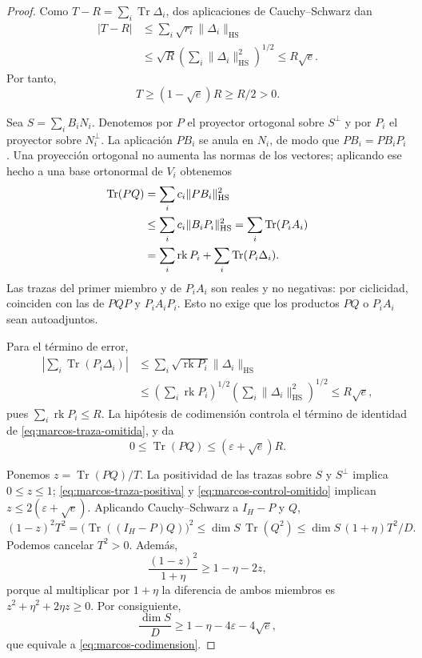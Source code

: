 \begin{proof}
Como $T-R=\sum_i\operatorname{Tr}\Delta_i$, dos aplicaciones de
Cauchy--Schwarz dan
\begin{align*}
 |T-R|&\le\sum_i\sqrt{r_i}\|\Delta_i\|_{\mathrm{HS}}\\
 &\le\sqrt R\left(\sum_i\|\Delta_i\|_{\mathrm{HS}}^2\right)^{1/2}
 \le R\sqrt e.
\end{align*}
Por tanto,
\begin{equation}
 T\ge(1-\sqrt e)R\ge R/2>0.
 \label{eq:marcos-traza-positiva}
\end{equation}

Sea $S=\sum_iB_iN_i$. Denotemos por $P$ el proyector ortogonal
sobre $S^\perp$ y por $P_i$ el proyector sobre $N_i^\perp$.
La aplicación $PB_i$ se anula en $N_i$, de modo que $PB_i=PB_iP_i$.
Una proyección ortogonal no aumenta las normas de los vectores; aplicando
ese hecho a una base ortonormal de $V_i$ obtenemos
\begin{align}
 \operatorname{Tr}(PQ)
 &=\sum_i c_i\|PB_i\|_{\mathrm{HS}}^2\notag\\
 &\le\sum_i c_i\|B_iP_i\|_{\mathrm{HS}}^2
 =\sum_i\operatorname{Tr}(P_iA_i)\notag\\
 &=\sum_i\operatorname{rk}P_i+
       \sum_i\operatorname{Tr}(P_i\Delta_i).
 \label{eq:marcos-traza-omitida}
\end{align}
Las trazas del primer miembro y de $P_iA_i$ son reales y no negativas:
por ciclicidad, coinciden con las de $PQP$ y $P_iA_iP_i$.
Esto no exige que los productos $PQ$ o $P_iA_i$ sean autoadjuntos.

Para el término de error,
\begin{align*}
 \left|\sum_i\operatorname{Tr}(P_i\Delta_i)\right|
 &\le\sum_i\sqrt{\operatorname{rk}P_i}\|\Delta_i\|_{\mathrm{HS}}\\
 &\le\left(\sum_i\operatorname{rk}P_i\right)^{1/2}
       \left(\sum_i\|\Delta_i\|_{\mathrm{HS}}^2\right)^{1/2}
 \le R\sqrt e,
\end{align*}
pues $\sum_i\operatorname{rk}P_i\le R$. La hipótesis de codimensión
controla el término de identidad de \eqref{eq:marcos-traza-omitida}, y da
\begin{equation}
 0\le\operatorname{Tr}(PQ)\le(\varepsilon+\sqrt e)R.
 \label{eq:marcos-control-omitido}
\end{equation}

Ponemos $z=\operatorname{Tr}(PQ)/T$. La positividad de las trazas
sobre $S$ y $S^\perp$ implica $0\le z\le1$;
\eqref{eq:marcos-traza-positiva} y \eqref{eq:marcos-control-omitido}
implican $z\le2(\varepsilon+\sqrt e)$. Aplicando Cauchy--Schwarz
a $I_H-P$ y $Q$,
\[
 (1-z)^2T^2
 =\bigl(\operatorname{Tr}((I_H-P)Q)\bigr)^2
 \le\dim S\,\operatorname{Tr}(Q^2)
 \le\dim S\,(1+\eta)T^2/D.
\]
Podemos cancelar $T^2>0$. Además,
\[
 \frac{(1-z)^2}{1+\eta}\ge1-\eta-2z,
\]
porque al multiplicar por $1+\eta$ la diferencia de ambos miembros
es $z^2+\eta^2+2\eta z\ge0$. Por consiguiente,
\[
 \frac{\dim S}{D}\ge1-\eta-4\varepsilon-4\sqrt e,
\]
que equivale a \eqref{eq:marcos-codimension}.
\end{proof}

